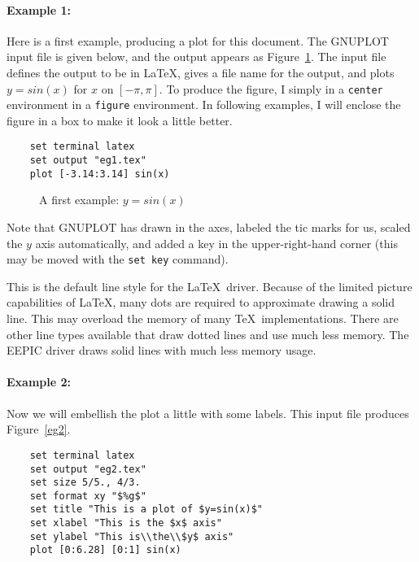 \paragraph{Example 1:} Here is a first example, producing a plot for
this document. The GNUPLOT input file is given below, and the output
appears as Figure~\ref{eg1}. The input file defines the output to be
in \LaTeX, gives a file name for the output, and plots $y=sin(x)$ for
$x$ on $[-\pi,\pi]$. To produce the figure, I simply
\verb++ in a {\tt center} environment in a {\tt figure}
environment. In following examples, I will enclose the figure in a box
to make it look a little better.

\singlespace
\begin{verbatim}
    set terminal latex
    set output "eg1.tex"
    plot [-3.14:3.14] sin(x)
\end{verbatim}
\currentspace

\begin{figure}[htbp]
  \begin{center}
    
  \end{center}
  \caption{A first example: $y=sin(x)$} 
  \label{eg1}
\end{figure}

Note that GNUPLOT has drawn in the axes, labeled the tic marks for us,
scaled the $y$ axis automatically, and added a key in the
upper-right-hand corner (this may be moved with the {\tt set key}
command).

This is the default line style for the \LaTeX\ driver.  Because of the
limited picture capabilities of \LaTeX, many dots are required to
approximate drawing a solid line. This may overload the memory of many
\TeX\ implementations. There are other line types available that draw
dotted lines and use much less memory. The EEPIC driver draws solid
lines with much less memory usage.

\paragraph{Example 2:} Now we will embellish the plot a little with
some labels.  This input file produces Figure~\ref{eg2}.

\singlespace
\begin{verbatim}
    set terminal latex
    set output "eg2.tex"
    set size 5/5., 4/3.
    set format xy "$%g$"
    set title "This is a plot of $y=sin(x)$"
    set xlabel "This is the $x$ axis"
    set ylabel "This is\\the\\$y$ axis"
    plot [0:6.28] [0:1] sin(x)
\end{verbatim}
\currentspace

